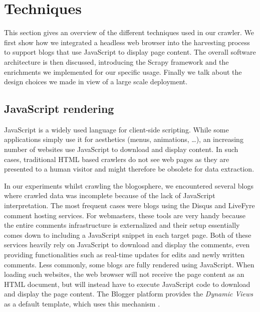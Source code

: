 \section{Techniques}

This section gives an overview of the different techniques used in our crawler. We first show how we integrated a headless web browser into the harvesting process to support blogs that use JavaScript to display page content. The overall software architecture is then discussed, introducing the Scrapy framework and the enrichments we implemented for our specific usage. Finally we talk about the design choices we made in view of a large scale deployment.


\subsection{JavaScript rendering}
JavaScript is a widely used language for client-side scripting. While some applications simply use it for aesthetics (menus, animations, \ldots), an increasing number of websites use JavaScript to download and display content. In such cases, traditional HTML based crawlers do not see web pages as they are presented to a human visitor and might therefore be obsolete for data extraction.

In our experiments whilst crawling the blogosphere, we encountered several blogs where crawled data was incomplete because of the lack of JavaScript interpretation. The most frequent cases were blogs using the Disqus \cite{disqus2013} and LiveFyre \cite{livefyre2013} comment hosting services. For webmasters, these tools are very handy because the entire comments infrastructure is externalized and their setup essentially comes down to including a JavaScript snippet in each target page. Both of these services heavily rely on JavaScript to download and display the comments, even providing functionalities such as real-time updates for edits and newly written comments. Less commonly, some blogs are fully rendered using JavaScript. When loading such websites, the web browser will not receive the page content as an HTML document, but will instead have to execute JavaScript code to download and display the page content. The Blogger platform provides the \emph{Dynamic Views} as a default template, which uses this mechanism \cite{antinharasymiv2011}.


